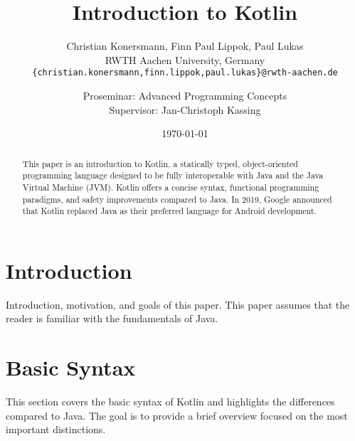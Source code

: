 \documentclass[a4paper, 11pt]{article}
\title{\huge \bfseries Introduction to Kotlin}
\author{
  Christian Konersmann, Finn Paul Lippok, Paul Lukas \\[1ex]
  RWTH Aachen University, Germany \\
  \texttt{\{christian.konersmann,finn.lippok,paul.lukas\}@rwth-aachen.de}\\
  \and
  Proseminar: Advanced Programming Concepts \\
  Supervisor: Jan-Christoph Kassing
}
\date{\today}
\begin{document}
\maketitle

\begin{abstract}
  This paper is an introduction to Kotlin, a statically typed, object-oriented programming language designed to be fully interoperable with Java and the Java Virtual Machine (JVM).
  Kotlin offers a concise syntax, functional programming paradigms, and safety improvements compared to Java. In 2019, Google announced that Kotlin replaced Java as their preferred language for Android development.
\end{abstract}

\section{Introduction}
  Introduction, motivation, and goals of this paper.
  This paper assumes that the reader is familiar with the fundamentals of Java.
\section{Basic Syntax}
  This section covers the basic syntax of Kotlin and highlights the differences compared to Java.
  The goal is to provide a brief overview focused on the most important distinctions.
\end{document}
